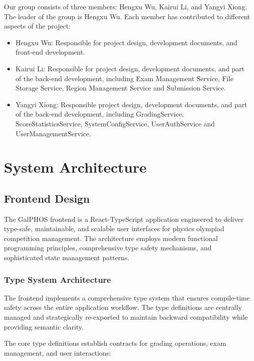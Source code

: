 \documentclass[12pt]{article}
\begin{document}
Our group consists of three members: Hengxu Wu, Kairui Li, and Yangyi Xiong. The leader of the group is Hengxu Wu. Each member has contributed to different aspects of the project:
\begin{itemize}
    \item Hengxu Wu: Responsible for project design, development documents, and front-end development.
    \item Kairui Li: Responsible for project design, development documents, and part of the back-end development, including Exam Management Service, File Storage Service, Region Management Service and Submission Service.
    \item Yangyi Xiong: Responsible project design, development documents, and part of the back-end development, including GradingService, ScoreStatisticsService, SystemConfigService, UserAuthService and UserManagementService.
\end{itemize}

\section{System Architecture}
\subsection{Frontend Design}

The GalPHOS frontend is a React-TypeScript application engineered to deliver type-safe, maintainable, and scalable user interfaces for physics olympiad competition management. The architecture employs modern functional programming principles, comprehensive type safety mechanisms, and sophisticated state management patterns.

\subsubsection{Type System Architecture}

The frontend implements a comprehensive type system that ensures compile-time safety across the entire application workflow. The type definitions are centrally managed and strategically re-exported to maintain backward compatibility while providing semantic clarity.

The core type definitions establish contracts for grading operations, exam management, and user interactions:
\end{document}
